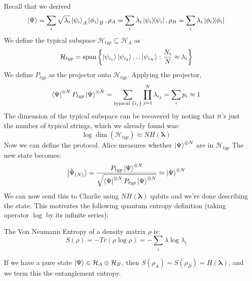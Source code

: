 Recall that we derived
\[ \ket{\Psi} = \sum_i \sqrt{\lambda_i} \ket{\psi_i}_A \ket{\phi_i}_B, \rho_A = \sum_i \lambda_i \ketbra{\psi_i}, \rho_B = \sum_i \lambda_i \ketbra{\phi_i} \]
We define the typical subspace $\mathcal{H}_{typ} \subseteq \mathcal{H}_A$ as
\[ \mathcal{H}_{typ} = \textrm{span}\left\{ \ket{\psi_{i_1}} \ket{\psi_{i_2}} \dots  \ket{\psi_{i_N}} : \frac{N_i}{N} \approx \lambda_i \right\} \]
We define $P_{typ}$ as the projector onto $\mathcal{H}_{typ}$. Applying the projector,
\[ \bra{\Psi}^{\otimes N} P_{typ} \ket{\Psi}^{\otimes N} = \sum_{\text{typical } \{i_j\} }  \prod_{j = 1}^N \lambda_{i_j} = \sum_{ i} p_i \approx 1 \]
The dimension of the typical subspace can be recovered by noting that it's just the number of typical strings, which we already found was:
\[ \log \dim(\mathcal{H}_{typ}) \approx N H(\mathbf{\lambda}) \]
Now we can define the protocol. Alice measures whether $\ket{\Psi}^{\otimes N}$ are in $\mathcal{H}_{typ}$ The new state becomes:
\[ \ket{\tilde{\Psi}_{(N)}} = \frac{P_{typ} \ket{\Psi}^{\otimes N}}{\sqrt{\bra{\Psi}^{\otimes N} P_{typ} \ket{\Psi}^{\otimes N} }} \approx \ket{\Psi}^{\otimes N}\]
We can now send this to Charlie using $N H(\mathbf{\lambda})$ qubits and we're done describing the state.
This motivates the following quantum entropy definition (taking operator $\log$ by its infinite series):
\begin{definition}
    The Von Neumann Entropy of a density matrix $\rho$ is:
    \[ S(\rho) = -Tr(\rho \log \rho) = - \sum_i \lambda \log \lambda_i\]
\end{definition}
If we have a pure state $\ket{\Psi} \in \mathcal{H}_A \otimes \mathcal{H}_B$, then $S(\rho_A) = S(\rho_B) = H(\mathbf{\lambda})$, and we term this
the entanglement entropy.

